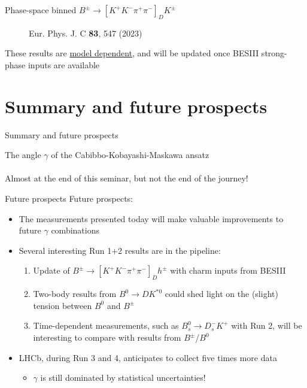 \documentclass[dvipsnames]{beamer}
\begin{document}
\begin{frame}{Phase-space binned $B^\pm\to[K^+K^-\pi^+\pi^-]_DK^\pm$}
\begin{figure}[htb]
\begin{subfigure}{0.5\textwidth}
    \end{subfigure}
    \vspace{-0.5cm}
    \caption*{\tiny Eur. Phys. J. C \textbf{83}, 547 (2023)}
  \end{figure}
  \vspace{-0.5cm}
  \begin{center}
    {\large These results are \underline{model dependent}, and will be updated once BESIII strong-phase inputs are available}
  \end{center}
\end{frame}

\section{Summary and future prospects}
\begin{frame}{Summary and future prospects}
  \begin{center}
    {\huge The angle $\gamma$ of the Cabibbo-Kobayashi-Maskawa ansatz} \\~\\
    {\large Almost at the end of this seminar, but not the end of the journey!}
  \end{center}
\end{frame}

\begin{frame}{Future prospects}
  \vspace{0.0cm}
  {\Large Future prospects:}
  \vspace{0.3cm}
  \begin{itemize}
    \setlength\itemsep{1.0em}
    \item{The measurements presented today will make valuable improvements to future $\gamma$ combinations}
    \item{Several interesting Run 1$+$2 results are in the pipeline:}
    \begin{enumerate}
      \setlength\itemsep{0.3em}
      \item{Update of $B^\pm\to[K^+K^-\pi^+\pi^-]_Dh^\pm$ with charm inputs from BESIII}
      \item{Two-body results from $B^0\to DK^{*0}$ could shed light on the (slight) tension between $B^0$ and $B^\pm$}
      \item{Time-dependent measurements, such as $B_s^0\to D_s^-K^+$ with Run 2, will be interesting to compare with results from $B^\pm$/$B^0$}
    \end{enumerate}
    \item{LHCb, during Run 3 and 4, anticipates to collect five times more data}
    \begin{itemize}
      \item{$\gamma$ is still dominated by statistical uncertainties!}
    \end{itemize}
  \end{itemize}
\end{frame}
\end{document}
